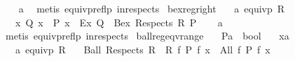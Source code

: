 \begin{isabellebody}
%
\isadelimproof
\ \ %
\endisadelimproof
%
\isatagproof
{}\isamarkupfalse%
\ a\ \isamarkupfalse%
\ {\isacharparenleft}{\kern0pt}metis\ equivp{\isacharunderscore}{\kern0pt}reflp\ in{\isacharunderscore}{\kern0pt}respects{\isacharparenright}{\kern0pt}%
\endisatagproof
{\isafoldproof}%
%
\isadelimproof
\isanewline
%
\endisadelimproof
\isanewline
{}\isamarkupfalse%
\ bex{\isacharunderscore}{\kern0pt}reg{\isacharunderscore}{\kern0pt}right{\isacharcolon}{\kern0pt}\isanewline
\ \ \ a{\isacharcolon}{\kern0pt}\ {\isachardoublequoteopen}equivp\ R{\isachardoublequoteclose}\isanewline
\ \ \ {\isachardoublequoteopen}{\isacharparenleft}{\kern0pt}{\isasymAnd}x{\isachardot}{\kern0pt}\ {\isacharparenleft}{\kern0pt}Q\ x\ {\isasymlongrightarrow}\ P\ x{\isacharparenright}{\kern0pt}{\isacharparenright}{\kern0pt}\ {\isasymLongrightarrow}\ Ex\ Q\ {\isasymlongrightarrow}\ Bex\ {\isacharparenleft}{\kern0pt}Respects\ R{\isacharparenright}{\kern0pt}\ P{\isachardoublequoteclose}\isanewline
%
\isadelimproof
\ \ %
\endisadelimproof
%
\isatagproof
{}\isamarkupfalse%
\ a\ \isamarkupfalse%
\ {\isacharparenleft}{\kern0pt}metis\ equivp{\isacharunderscore}{\kern0pt}reflp\ in{\isacharunderscore}{\kern0pt}respects{\isacharparenright}{\kern0pt}%
\endisatagproof
{\isafoldproof}%
%
\isadelimproof
\isanewline
%
\endisadelimproof
\isanewline
{}\isamarkupfalse%
\ ball{\isacharunderscore}{\kern0pt}reg{\isacharunderscore}{\kern0pt}eqv{\isacharunderscore}{\kern0pt}range{\isacharcolon}{\kern0pt}\isanewline
\ \ \ P{\isacharcolon}{\kern0pt}{\isacharcolon}{\kern0pt}{\isachardoublequoteopen}{\isacharprime}{\kern0pt}a\ {\isasymRightarrow}\ bool{\isachardoublequoteclose}\isanewline
\ \ \ x{\isacharcolon}{\kern0pt}{\isacharcolon}{\kern0pt}{\isachardoublequoteopen}{\isacharprime}{\kern0pt}a{\isachardoublequoteclose}\isanewline
\ \ \ a{\isacharcolon}{\kern0pt}\ {\isachardoublequoteopen}equivp\ R{}{\isachardoublequoteclose}\isanewline
\ \ \ {\isachardoublequoteopen}{\isacharparenleft}{\kern0pt}Ball\ {\isacharparenleft}{\kern0pt}Respects\ {\isacharparenleft}{\kern0pt}R{}\ {\isacharequal}{\kern0pt}{\isacharequal}{\kern0pt}{\isacharequal}{\kern0pt}{\isachargreater}{\kern0pt}\ R{}{\isacharparenright}{\kern0pt}{\isacharparenright}{\kern0pt}\ {\isacharparenleft}{\kern0pt}{\isasymlambda}f{\isachardot}{\kern0pt}\ P\ {\isacharparenleft}{\kern0pt}f\ x{\isacharparenright}{\kern0pt}{\isacharparenright}{\kern0pt}\ {\isacharequal}{\kern0pt}\ All\ {\isacharparenleft}{\kern0pt}{\isasymlambda}f{\isachardot}{\kern0pt}\ P\ {\isacharparenleft}{\kern0pt}f\ x{\isacharparenright}{\kern0pt}{\isacharparenright}{\kern0pt}{\isacharparenright}{\kern0pt}{\isachardoublequoteclose}\isanewline

\end{isabellebody}
